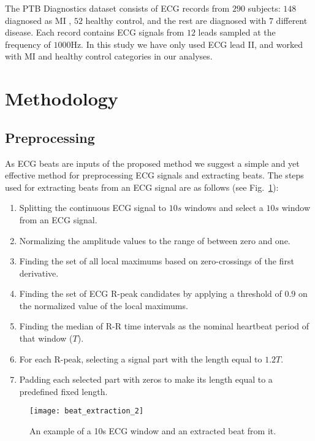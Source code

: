 \documentclass[10pt, conference, compsocconf]{IEEEtran}
\begin{document}
The PTB Diagnostics dataset consists of ECG records from $290$ subjects: $148$ diagnosed as MI , $52$ healthy control, and the rest are diagnosed with $7$ different disease. Each record contains ECG signals from $12$ leads sampled at the frequency of $1000 \text{Hz}$. In this study we have only used ECG lead II, and worked with MI and healthy control categories in our analyses.


\section{Methodology}
\label{sec:Methodology}


\subsection{Preprocessing}
\label{sec:Preprocessing}
As ECG beats are inputs of the proposed method we suggest a simple and yet effective method for preprocessing ECG signals and extracting beats. The steps used for extracting beats from an ECG signal are as follows (see Fig.~\ref{fig:beat_extraction}):
\begin{enumerate}
    \item Splitting the continuous ECG signal to $10s$ windows and select a $10s$ window from an ECG signal.
    \item Normalizing the amplitude values to the range of between zero and one.
    \item Finding the set of all local maximums based on zero-crossings of the first derivative.
    \item Finding the set of ECG R-peak candidates by applying a threshold of $0.9$ on the normalized value of the local maximums.
    \item Finding the median of R-R time intervals as the nominal heartbeat period of that window ($T$).
    \item For each R-peak, selecting a signal part with the length equal to $1.2 T$.
    \item Padding each selected part with zeros to make its length equal to a predefined fixed length.
\end{enumerate}

\begin{figure}[!t]
\centering
\texttt{[image: beat\_extraction\_2]}\caption{An example of a 10s ECG window and an extracted beat from it.}
\label{fig:beat_extraction}
\end{figure}
\end{document}
